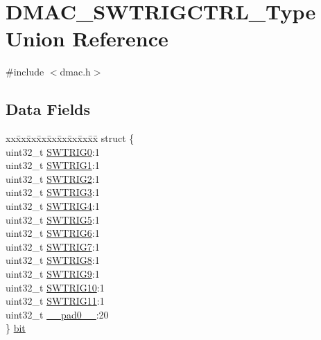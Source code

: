 \hypertarget{union_d_m_a_c___s_w_t_r_i_g_c_t_r_l___type}{}\section{D\+M\+A\+C\+\_\+\+S\+W\+T\+R\+I\+G\+C\+T\+R\+L\+\_\+\+Type Union Reference}
\label{union_d_m_a_c___s_w_t_r_i_g_c_t_r_l___type}


{\ttfamily \#include $<$dmac.\+h$>$}

\subsection*{Data Fields}
\begin{DoxyCompactItemize}
\item 
\begin{tabbing}
xx\=xx\=xx\=xx\=xx\=xx\=xx\=xx\=xx\=\kill
struct \{\\
\>uint32\_t \mbox{\hyperlink{union_d_m_a_c___s_w_t_r_i_g_c_t_r_l___type_a8ad44230a98cf3f7721c3139c683adce}{SWTRIG0}}:1\\
\>uint32\_t \mbox{\hyperlink{union_d_m_a_c___s_w_t_r_i_g_c_t_r_l___type_a3e5287dc6add53b40ad0b3f710dba926}{SWTRIG1}}:1\\
\>uint32\_t \mbox{\hyperlink{union_d_m_a_c___s_w_t_r_i_g_c_t_r_l___type_a15d51a9b6823723096b2f19938f7853e}{SWTRIG2}}:1\\
\>uint32\_t \mbox{\hyperlink{union_d_m_a_c___s_w_t_r_i_g_c_t_r_l___type_aa28465f7185054b8f559540327a1cfdd}{SWTRIG3}}:1\\
\>uint32\_t \mbox{\hyperlink{union_d_m_a_c___s_w_t_r_i_g_c_t_r_l___type_af2edc1249050fee99d217784087d0813}{SWTRIG4}}:1\\
\>uint32\_t \mbox{\hyperlink{union_d_m_a_c___s_w_t_r_i_g_c_t_r_l___type_a313783fedd92fab37cf7e9cd0f2d4b81}{SWTRIG5}}:1\\
\>uint32\_t \mbox{\hyperlink{union_d_m_a_c___s_w_t_r_i_g_c_t_r_l___type_a27f2b846efa59e76f79edef0432e7630}{SWTRIG6}}:1\\
\>uint32\_t \mbox{\hyperlink{union_d_m_a_c___s_w_t_r_i_g_c_t_r_l___type_a1fdfd4fc93121192caccbd31b9847008}{SWTRIG7}}:1\\
\>uint32\_t \mbox{\hyperlink{union_d_m_a_c___s_w_t_r_i_g_c_t_r_l___type_a599f35bdfa3fe7b33f732b2b04be171b}{SWTRIG8}}:1\\
\>uint32\_t \mbox{\hyperlink{union_d_m_a_c___s_w_t_r_i_g_c_t_r_l___type_ad419de281974df50ab7a7603c559ac6c}{SWTRIG9}}:1\\
\>uint32\_t \mbox{\hyperlink{union_d_m_a_c___s_w_t_r_i_g_c_t_r_l___type_a6a222aa538212d9b234231afc9b7e1b0}{SWTRIG10}}:1\\
\>uint32\_t \mbox{\hyperlink{union_d_m_a_c___s_w_t_r_i_g_c_t_r_l___type_aee641a4e928382762cc0f4a15a3846e5}{SWTRIG11}}:1\\
\>uint32\_t \mbox{\hyperlink{union_d_m_a_c___s_w_t_r_i_g_c_t_r_l___type_a3e57c2ef1c3ffb36722f000cc1156824}{\_\_pad0\_\_}}:20\\
\} \mbox{\hyperlink{union_d_m_a_c___s_w_t_r_i_g_c_t_r_l___type_a7c18efe3e13e9f26fbc952c3bd890d85}{bit}}\\


\end{tabbing}
\end{DoxyCompactItemize}
